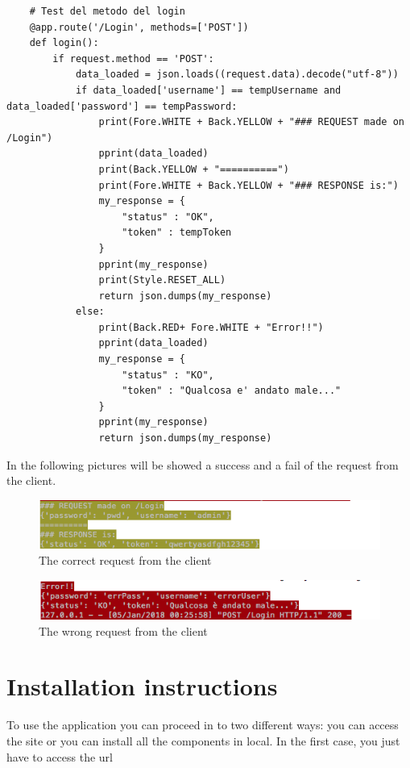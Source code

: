 \documentclass[numbers=noenddot, 12pt, a4paper, oneside]{scrbook}
\begin{document}
\lstset{language=Python}
\begin{lstlisting}
	# Test del metodo del login
	@app.route('/Login', methods=['POST'])
	def login():
		if request.method == 'POST':
			data_loaded = json.loads((request.data).decode("utf-8"))
			if data_loaded['username'] == tempUsername and data_loaded['password'] == tempPassword:
				print(Fore.WHITE + Back.YELLOW + "### REQUEST made on /Login")
				pprint(data_loaded)
				print(Back.YELLOW + "==========")
				print(Fore.WHITE + Back.YELLOW + "### RESPONSE is:")
				my_response = {
					"status" : "OK",
					"token" : tempToken
				}
				pprint(my_response)
				print(Style.RESET_ALL)
				return json.dumps(my_response)
			else:
				print(Back.RED+ Fore.WHITE + "Error!!")
				pprint(data_loaded)
				my_response = {
					"status" : "KO",
					"token" : "Qualcosa e' andato male..."
				}
				pprint(my_response)
				return json.dumps(my_response)
\end{lstlisting}

In the following pictures will be showed a success and a fail of the request from the client.
\vspace{1cm}
\begin{figure}[H]
	\centering
	\includegraphics[width=1.1\textwidth]{Test/LoginSuccess}
	\caption{The correct request from the client}
\end{figure}
\vspace{1cm}
\begin{figure}[H]
	\centering
	\includegraphics[width=1.1\textwidth]{Test/LoginError}
	\caption{The wrong request from the client}
\end{figure}


\chapter{Installation instructions}

To use the application you can proceed in to two different ways: you can access the site or you can install all the components in local. In the first case, you just have to access the url\\
\end{document}
